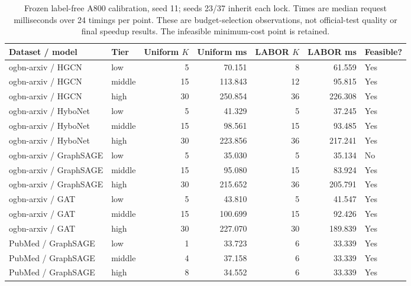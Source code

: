 \begin{table}[t]
\caption{Frozen label-free A800 calibration, seed 11; seeds 23/37 inherit each lock. Times are median request milliseconds over 24 timings per point. These are budget-selection observations, not official-test quality or final speedup results. The infeasible minimum-cost point is retained.}
\label{tab:a800-locks}
\centering
\begin{tabular}{llrrrrl}
\toprule
Dataset / model & Tier & Uniform $K$ & Uniform ms & LABOR $K$ & LABOR ms & Feasible? \\
\midrule
ogbn-arxiv / HGCN & low & 5 & 70.151 & 8 & 61.559 & Yes \\
ogbn-arxiv / HGCN & middle & 15 & 113.843 & 12 & 95.815 & Yes \\
ogbn-arxiv / HGCN & high & 30 & 250.854 & 36 & 226.308 & Yes \\
\addlinespace
ogbn-arxiv / HyboNet & low & 5 & 41.329 & 5 & 37.245 & Yes \\
ogbn-arxiv / HyboNet & middle & 15 & 98.561 & 15 & 93.485 & Yes \\
ogbn-arxiv / HyboNet & high & 30 & 223.856 & 36 & 217.241 & Yes \\
\addlinespace
ogbn-arxiv / GraphSAGE & low & 5 & 35.030 & 5 & 35.134 & No \\
ogbn-arxiv / GraphSAGE & middle & 15 & 95.080 & 15 & 83.924 & Yes \\
ogbn-arxiv / GraphSAGE & high & 30 & 215.652 & 36 & 205.791 & Yes \\
\addlinespace
ogbn-arxiv / GAT & low & 5 & 43.810 & 5 & 41.547 & Yes \\
ogbn-arxiv / GAT & middle & 15 & 100.699 & 15 & 92.426 & Yes \\
ogbn-arxiv / GAT & high & 30 & 227.070 & 30 & 189.839 & Yes \\
\addlinespace
PubMed / GraphSAGE & low & 1 & 33.723 & 6 & 33.339 & Yes \\
PubMed / GraphSAGE & middle & 4 & 37.158 & 6 & 33.339 & Yes \\
PubMed / GraphSAGE & high & 8 & 34.552 & 6 & 33.339 & Yes \\
\bottomrule
\end{tabular}
\end{table}
